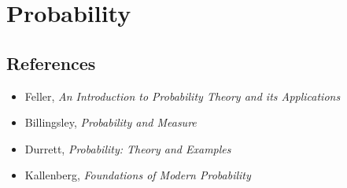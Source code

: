 \section{Probability}
\subsection*{References}
\begin{itemize}
    \item Feller, \emph{An Introduction to Probability Theory and its
        Applications}
    \item Billingsley, \emph{Probability and Measure}
    \item Durrett, \emph{Probability: Theory and Examples}
    \item Kallenberg, \emph{Foundations of Modern Probability}
\end{itemize}
